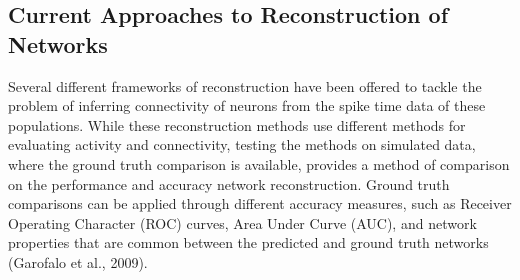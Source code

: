 \documentclass[11pt,titlepage]{article}
\begin{document}


\subsection{Current Approaches to Reconstruction of Networks}
Several different frameworks of reconstruction have been offered to tackle the problem of inferring connectivity of neurons from the spike time data of these populations. While these reconstruction methods use different methods for evaluating activity and connectivity, testing the methods on simulated data, where the ground truth comparison is available, provides a method of comparison on the performance and accuracy network reconstruction. Ground truth comparisons can be applied through different accuracy measures, such as Receiver Operating Character (ROC) curves, Area Under Curve (AUC), and network properties that are common between the predicted and ground truth networks (Garofalo et al., 2009).\par
\end{document}
